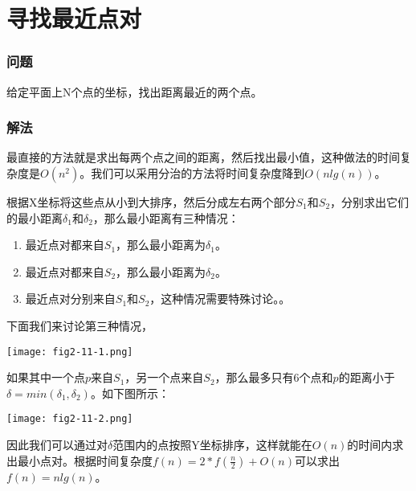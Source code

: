 \section{寻找最近点对} %
\label{sec:closest-pair-of-points}

\subsubsection{问题}
给定平面上N个点的坐标，找出距离最近的两个点。

\subsubsection{解法}
最直接的方法就是求出每两个点之间的距离，然后找出最小值，这种做法的时间复杂度是$O(n^2)$。我们可以采用分治的方法将时间复杂度降到$O(nlg(n))$。

根据X坐标将这些点从小到大排序，然后分成左右两个部分$S_1$和$S_2$，分别求出它们的最小距离$\delta_1$和$\delta_2$，那么最小距离有三种情况：
\begin{enumerate}
	\item 最近点对都来自$S_1$，那么最小距离为$\delta_1$。
	\item 最近点对都来自$S_2$，那么最小距离为$\delta_2$。
	\item 最近点对分别来自$S_1$和$S_2$，这种情况需要特殊讨论。。
\end{enumerate}
下面我们来讨论第三种情况，
\begin{center}
	\texttt{[image: fig2-11-1.png]}\\
	\label{fig:closest-pair-of-points-1}
\end{center}
如果其中一个点$p$来自$S_1$，另一个点来自$S_2$，那么最多只有6个点和$p$的距离小于$\delta = min(\delta_1, \delta_2)$。如下图所示：
\begin{center}
	\texttt{[image: fig2-11-2.png]}\\
	\label{fig:closest-pair-of-points-2}
\end{center}
因此我们可以通过对$\delta$范围内的点按照Y坐标排序，这样就能在$O(n)$的时间内求出最小点对。根据时间复杂度$f(n)=2*f(\frac{n}{2})+O(n)$可以求出$f(n)=nlg(n)$。

